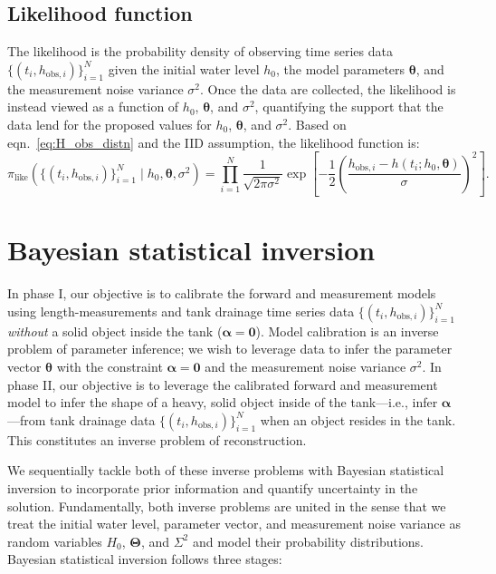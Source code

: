 \documentclass[openacc]{rsproca_new}%
\newcommand\thedata {$\{(t_i,h_{\text{obs}, i})\}_{i=1}^{N}$\xspace}
\newcommand\thedatanomath {\{(t_i,h_{\text{obs}, i})\}_{i=1}^{N}}
\begin{document}
\subsection{Likelihood function}
The likelihood is the probability density of observing time series data \thedata given the initial water level $h_0$, the model parameters $\boldsymbol \theta$, and the measurement noise variance $\sigma^2$. Once the data are collected, the likelihood is instead viewed as a function of $h_0$, $\boldsymbol \theta$, and $\sigma^2$, quantifying the support that the data lend for the proposed values for $h_0$, $\boldsymbol \theta$, and $\sigma^2$. Based on eqn.~\ref{eq:H_obs_distn} and the IID assumption, the likelihood function is:
\begin{equation}
 \pi_{\text{like}}(\thedatanomath \mid h_0, \boldsymbol \theta, \sigma^2 ) = \prod_{i=1}^N \frac{1}{\sqrt{2\pi\sigma^2}} \exp \left[-\frac{1}{2}\left(\frac{h_{\text{obs}, i} - h(t_i; h_0, \boldsymbol\theta)}{\sigma} \right)^2 \right]. \label{eq:like}
\end{equation}

\section{Bayesian statistical inversion}
In phase I, our objective is to calibrate the forward and measurement models using length-measurements and tank drainage time series data \thedata \emph{without} a solid object inside the tank ($\boldsymbol \alpha=\mathbf{0}$).
Model calibration is an inverse problem of parameter inference; we wish to leverage data to infer the parameter vector $\boldsymbol \theta$ with the constraint $\boldsymbol \alpha=\mathbf{0}$ and the measurement noise variance $\sigma^2$. 
In phase II, our objective is to leverage the calibrated forward and measurement model to infer the shape of a heavy, solid object inside of the tank---i.e., infer $\boldsymbol \alpha$---from tank drainage data \thedata when an object resides in the tank. This constitutes an inverse problem of reconstruction. 

We sequentially tackle both of these inverse problems with Bayesian statistical inversion \cite{calvetti2018inverse,waqar2023tutorial,kaipio2006statistical} to incorporate prior information and quantify uncertainty in the solution. 
Fundamentally, both inverse problems are united in the sense that we treat the initial water level, parameter vector, and measurement noise variance as random variables $H_0$, $\boldsymbol \Theta$, and $\Sigma^2$ and model their probability distributions.
Bayesian statistical inversion follows three stages:
\end{document}
